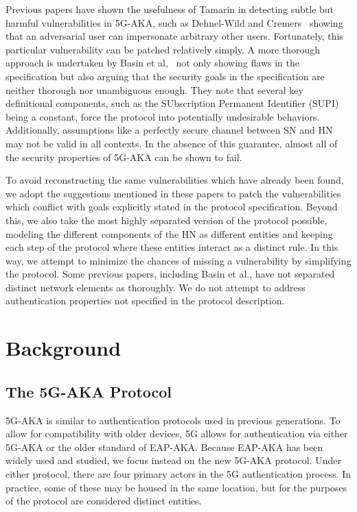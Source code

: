 \documentclass[10pt, pdftex]{article}
\begin{document}
Previous papers have shown the usefulness of Tamarin in detecting subtle but harmful vulnerabilities in 5G-AKA, such as Dehnel-Wild and Cremers~\cite{key} showing that an adversarial user can impersonate arbitrary other users. Fortunately, this particular vulnerability can be patched relatively simply. A more thorough approach is undertaken by Basin et al,~\cite{basin2018formal} not only showing flaws in the specification but also arguing that the security goals in the specification are neither thorough nor unambiguous enough. They note that several key definitional components, such as the SUbscription Permanent Identifier (SUPI) being a constant, force the protocol into potentially undesirable behaviors. Additionally, assumptions like a perfectly secure channel between SN and HN may not be valid in all contexts. In the absence of this guarantee, almost all of the security properties of 5G-AKA can be shown to fail.

To avoid reconstructing the same vulnerabilities which have already been found, we adopt the suggestions mentioned in these papers to patch the vulnerabilities which conflict with goals explicitly stated in the protocol specification. Beyond this, we also take the most highly separated version of the protocol possible, modeling the different components of the HN as different entities and keeping each step of the protocol where these entities interact as a distinct rule. In this way, we attempt to minimize the chances of missing a vulnerability by simplifying the protocol. Some previous papers, including Basin et al., have not separated distinct network elements as thoroughly. We do not attempt to address authentication properties not specified in the protocol description.

\section{Background}
\subsection{The 5G-AKA Protocol}

5G-AKA is similar to authentication protocols used in previous generations. To allow for compatibility with older devices, 5G allows for authentication via either 5G-AKA or the older standard of EAP-AKA. Because EAP-AKA has been widely used and studied, we focus instead on the new 5G-AKA protocol. Under either protocol, there are four primary actors in the 5G authentication process. In practice, some of these may be housed in the same location, but for the purposes of the protocol are considered distinct entities.
\end{document}
